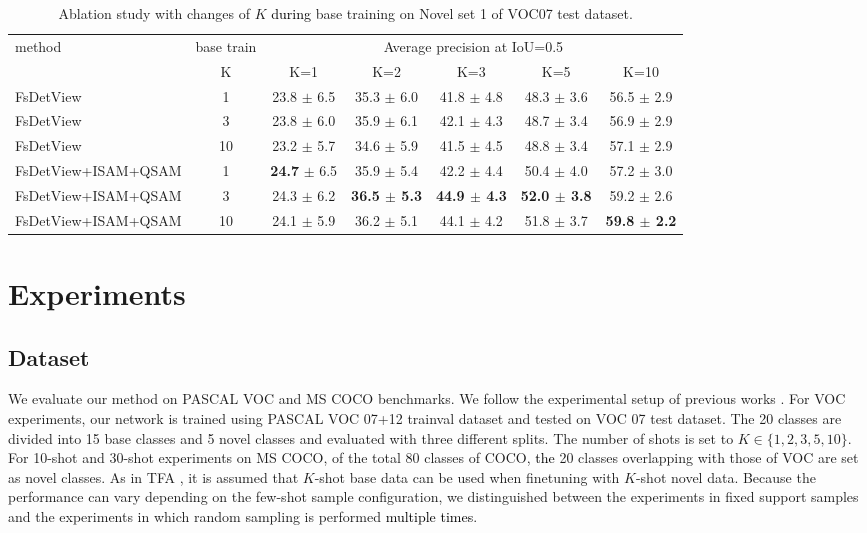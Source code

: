 \documentclass[10pt,twocolumn,letterpaper]{article}
\newcommand{\nj}[1]{\textcolor{black}{#1}}
\begin{document}
\begin{table*}
\begin{center}
\begin{tabular}{|l|c|c|c|c|c|c|}
\hline
\multirow{2}{*}{method} & base train & \multicolumn{5}{c|}{Average precision at IoU=0.5}      \\ \cline{3-7} 
   & K & K=1 & K=2 & K=3 & K=5 & K=10  \\
\hline\hline
FsDetView  & 1 & 23.8 $\pm$ 6.5 &  35.3 $\pm$ 6.0 & 41.8 $\pm$ 4.8 & 48.3 $\pm$ 3.6 & 56.5 $\pm$ 2.9 \\
FsDetView  & 3 & 23.8 $\pm$ 6.0 & 35.9 $\pm$ 6.1 & 42.1 $\pm$ 4.3 & 48.7 $\pm$ 3.4 & 56.9 $\pm$ 2.9 \\
FsDetView  & 10 & 23.2 $\pm$ 5.7 & 34.6 $\pm$ 5.9 & 41.5 $\pm$ 4.5 & 48.8 $\pm$ 3.4 & 57.1 $\pm$ 2.9 \\ \hline
FsDetView+ISAM+QSAM & 1 & \textbf{24.7} $\pm$ 6.5 & 35.9 $\pm$ 5.4 & 42.2 $\pm$ 4.4 & 50.4 $\pm$ 4.0 & 57.2 $\pm$ 3.0 \\ 
FsDetView+ISAM+QSAM & 3 & 24.3 $\pm$ 6.2 & \textbf{36.5 $\pm$ 5.3} & \textbf{44.9 $\pm$ 4.3} & \textbf{52.0 $\pm$ 3.8} & 59.2 $\pm$ 2.6 \\ 
FsDetView+ISAM+QSAM & 10 & 24.1 $\pm$ 5.9 & 36.2 $\pm$ 5.1 & 44.1 $\pm$ 4.2 & 51.8 $\pm$ 3.7 & \textbf{59.8 $\pm$ 2.2} \\ \hline
\end{tabular}
\end{center}
\caption{Ablation study with changes of $K$ \nj{during} base training on Novel set 1 of VOC07 test dataset.}
\label{table:voc_abl_2_num_shot_K}
\end{table*}

\section{Experiments}
\label{sec:experiments}

\subsection{Dataset}
\label{subsec:data}
We evaluate our method on PASCAL VOC \cite{pascal-voc-2007, pascal-voc-2012} and MS COCO \cite{lin2015microsoft} benchmarks. We follow the experimental setup of previous works \cite{yan2019meta,kang2019few, wang2020frustratingly, xiao2020few}. For VOC experiments, our network is trained using PASCAL VOC 07+12 trainval dataset and tested on VOC 07 test dataset. The 20 classes are divided into 15 base classes and 5 novel classes and evaluated with three different splits. The number of shots is set to $K \in \{1,2,3,5,10\}$. For 10-shot and 30-shot experiments on MS COCO, of the total 80 classes of COCO, \nj{the} 20 classes overlapping with those of VOC are set as novel classes. As in TFA \cite{wang2020frustratingly}, it is assumed that $K$-shot base data can be used when finetuning with $K$-shot novel data. Because the performance can vary depending on the few-shot sample configuration, we distinguished between the experiments in fixed support samples and the experiments in which random sampling is performed \nj{multiple times}.
\end{document}

